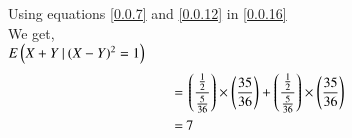 \documentclass[journal,12pt,twocolumn]{IEEEtran}
\begin{document}
\newline\\\\
Using equations \eqref{0.0.7} and \eqref{0.0.12} in \eqref{0.0.16}\\
We get,\\
\newline
$E\left(X+Y\:|\:(X-Y)^2=1\right)$
\begin{align}
    =&\:\left(\frac{\frac{1}{2}}{\frac{5}{36}}\right)\times\left(\frac{35}{36}\right)+\left(\frac{\frac{1}{2}}{\frac{5}{36}}\right)\times\left(\frac{35}{36}\right)\\
    =&\:7
\end{align}
\end{document}
